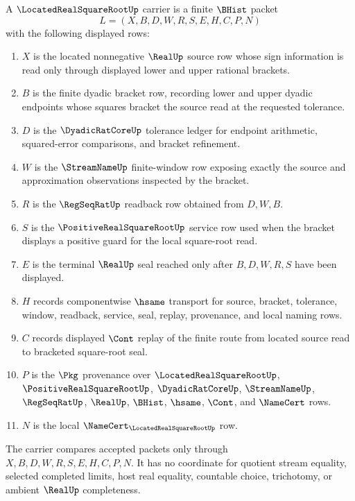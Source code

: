 \begin{definition}
\label{def:located-real-square-root-packet}
A $\LocatedRealSquareRootUp$ carrier is a finite $\BHist$ packet
$$
L=(X,B,D,W,R,S,E,H,C,P,N)
$$
with the following displayed rows:
\begin{enumerate}
\item $X$ is the located nonnegative $\RealUp$ source row whose sign information is read only through displayed lower and upper rational brackets.
\item $B$ is the finite dyadic bracket row, recording lower and upper dyadic endpoints whose squares bracket the source read at the requested tolerance.
\item $D$ is the $\DyadicRatCoreUp$ tolerance ledger for endpoint arithmetic, squared-error comparisons, and bracket refinement.
\item $W$ is the $\StreamNameUp$ finite-window row exposing exactly the source and approximation observations inspected by the bracket.
\item $R$ is the $\RegSeqRatUp$ readback row obtained from $D,W,B$.
\item $S$ is the $\PositiveRealSquareRootUp$ service row used when the bracket displays a positive guard for the local square-root read.
\item $E$ is the terminal $\RealUp$ seal reached only after $B,D,W,R,S$ have been displayed.
\item $H$ records componentwise $\hsame$ transport for source, bracket, tolerance, window, readback, service, seal, replay, provenance, and local naming rows.
\item $C$ records displayed $\Cont$ replay of the finite route from located source read to bracketed square-root seal.
\item $P$ is the $\Pkg$ provenance over $\LocatedRealSquareRootUp$, $\PositiveRealSquareRootUp$, $\DyadicRatCoreUp$, $\StreamNameUp$, $\RegSeqRatUp$, $\RealUp$, $\BHist$, $\hsame$, $\Cont$, and $\NameCert$ rows.
\item $N$ is the local $\NameCert_{\LocatedRealSquareRootUp}$ row.
\end{enumerate}
The carrier compares accepted packets only through $X,B,D,W,R,S,E,H,C,P,N$. It has no coordinate for quotient stream equality, selected completed limits, host real equality, countable choice, trichotomy, or ambient $\RealUp$ completeness.
\end{definition}

